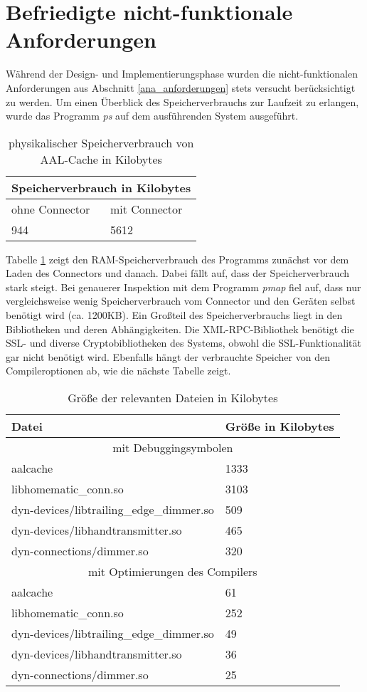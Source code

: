 \section{Befriedigte nicht-funktionale Anforderungen}
Während der Design- und Implementierungsphase wurden die nicht-funktionalen Anforderungen aus Abschnitt \ref{ana_anforderungen} 
stets versucht berücksichtigt zu werden.
Um einen Überblick des Speicherverbrauchs zur Laufzeit zu erlangen, wurde das Programm \emph{ps} \cite{procps} auf dem
ausführenden System ausgeführt.

\begin{table}[h]
\begin{tabular}{|l|l|}
\hline
\multicolumn{2}{|c|}{Speicherverbrauch in Kilobytes}\\
\hline
ohne Connector & mit Connector\\
\hline
944 & 5612\\
\hline
\end{tabular}
\caption{physikalischer Speicherverbrauch von AAL-Cache in Kilobytes}
\label{tab_mem}
\end{table}

Tabelle \ref{tab_mem} zeigt den RAM-Speicherverbrauch des Programms zunächst
vor dem Laden des Connectors und danach.
Dabei fällt auf, dass der Speicherverbrauch stark steigt.
Bei genauerer Inspektion mit dem Programm \emph{pmap} \cite{procps} fiel auf,
dass nur vergleichsweise wenig Speicherverbrauch vom Connector und den Geräten selbst benötigt wird
(ca. 1200KB).
Ein Großteil des Speicherverbrauchs liegt in den Bibliotheken und deren Abhängigkeiten.
Die XML-RPC-Bibliothek benötigt die SSL- und diverse Cryptobibliotheken des Systems, obwohl
die SSL-Funktionalität gar nicht benötigt wird.
Ebenfalls hängt der verbrauchte Speicher von den Compileroptionen ab, wie die nächste
Tabelle zeigt.

\begin{table}[h]
\begin{tabular}{|l|l|}
\hline
Datei & Größe in Kilobytes\\
\hline
\multicolumn{2}{|c|}{mit Debuggingsymbolen}\\
\hline
aalcache & 1333\\
libhomematic\_conn.so & 3103\\
dyn-devices/libtrailing\_edge\_dimmer.so & 509\\
dyn-devices/libhandtransmitter.so & 465\\
dyn-connections/dimmer.so & 320\\
\hline
\multicolumn{2}{|c|}{mit Optimierungen des Compilers}\\
\hline
aalcache & 61\\
libhomematic\_conn.so & 252\\
dyn-devices/libtrailing\_edge\_dimmer.so & 49\\
dyn-devices/libhandtransmitter.so & 36\\
dyn-connections/dimmer.so & 25\\
\hline
\end{tabular}
\caption{Größe der relevanten Dateien in Kilobytes}
\label{tab_sizes}
\end{table}


